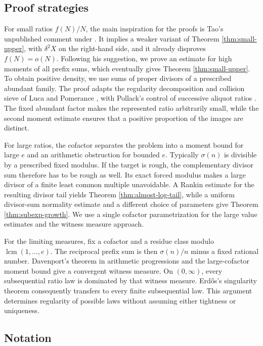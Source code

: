 \documentclass[11pt,letterpaper,reqno]{amsart}
\numberwithin{equation}{section}
\theoremstyle{remark}
\newcommand{\1}{\mathbf 1}
\DeclareMathOperator{\lcm}{lcm}
\begin{document}
\subsection{Proof strategies}

For small ratios $f(N)/N$, the main inspiration for the proofs is Tao's unpublished comment under \cite{Bloom1054}. It implies a weaker variant of Theorem \ref{thm:small-upper}, with $\delta^2 X$ on the right-hand side, and it already disproves $f(N)=o(N)$. Following his suggestion, we prove an
estimate for high moments of all prefix sums, which eventually gives Theorem \ref{thm:small-upper}. To obtain
positive density, we use sums of proper divisors of a prescribed abundant
family. The proof adapts the regularity decomposition and collision sieve
of Luca and Pomerance \cite{LucaPomerance}, with Pollack's control of
successive aliquot ratios \cite{Pollack}. The fixed abundant factor makes
the represented ratio arbitrarily small, while the second moment estimate
ensures that a positive proportion of the images are distinct.

For large ratios, the cofactor separates the problem into a moment bound
for large $e$ and an arithmetic obstruction for bounded $e$. Typically
$\sigma(n)$ is divisible by a prescribed fixed modulus. If the target is
rough, the complementary divisor sum therefore has to be rough as well.
Its exact forced modulus makes a large divisor of a finite least common
multiple unavoidable. A Rankin estimate for the resulting divisor tail
yields Theorem \ref{thm:almost-log-tail}, while a uniform divisor-sum normality
estimate and a different choice of parameters give
Theorem \ref{thm:subexp-growth}. We use a single cofactor parametrization
for the large value estimates and the witness measure approach.

For the limiting measures, fix a cofactor and a residue class modulo
$\lcm(1,\ldots,e)$. The reciprocal prefix sum is then
$\sigma(n)/n$ minus a fixed rational number. Davenport's theorem in
arithmetic progressions \cite{PollackPalindromes} and the large-cofactor
moment bound give a convergent witness measure. On $(0,\infty)$, every subsequential ratio law is dominated by that witness measure. Erd\H{o}s's singularity
theorem \cite{ErdosDistribution} consequently transfers to every finite
subsequential law. This argument determines regularity of possible laws
without assuming either tightness or uniqueness.


\subsection{Notation}
\end{document}

